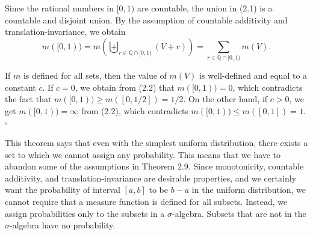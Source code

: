 Since the rational numbers in $[0,1)$ are countable, the union in (2.1) is a countable and disjoint union. By the assumption of countable additivity and translation-invariance, we obtain
\begin{equation}
m([0,1))=m\left(\biguplus_{r\in \mathbb{Q}\cap [0,1)} (V+r)\right)
=
\sum_{r\in \mathbb{Q}\cap [0,1)} m(V).
\tag{2.2}
\end{equation}

If $m$ is defined for all sets, then the value of $m(V)$ is well-defined and equal to a constant $c$. If $c=0$, we obtain from (2.2) that $m([0,1))=0$, which contradicts the fact that $m([0,1))\ge m([0,1/2])=1/2$. On the other hand, if $c>0$, we get $m([0,1))=\infty$ from (2.2), which contradicts $m([0,1))\le m([0,1])=1$. \hfill $\square$

This theorem says that even with the simplest uniform distribution, there exists a set to which we cannot assign any probability. This means that we have to abandon some of the assumptions in Theorem 2.9. Since monotonicity, countable additivity, and translation-invariance are desirable properties, and we certainly want the probability of interval $[a,b]$ to be $b-a$ in the uniform distribution, we cannot require that a measure function is defined for all subsets. Instead, we assign probabilities only to the subsets in a $\sigma$-algebra. Subsets that are not in the $\sigma$-algebra have no probability.
